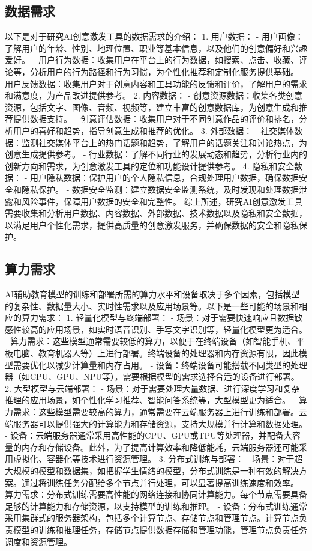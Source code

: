 \subsection{数据需求}
以下是对于研究AI创意激发工具的数据需求的介绍：
1. 用户数据：
- 用户画像：了解用户的年龄、性别、地理位置、职业等基本信息，以及他们的创意偏好和兴趣爱好。
- 用户行为数据：收集用户在平台上的行为数据，如搜索、点击、收藏、评论等，分析用户的行为路径和行为习惯，为个性化推荐和定制化服务提供基础。
- 用户反馈数据：收集用户对于创意内容和工具功能的反馈和评价，了解用户的需求和满意度，为产品改进提供参考。
2. 内容数据：
- 创意资源数据：收集各类创意资源，包括文字、图像、音频、视频等，建立丰富的创意数据库，为创意生成和推荐提供数据支持。
- 创意评估数据：收集用户对于不同创意作品的评价和排名，分析用户的喜好和趋势，指导创意生成和推荐的优化。
3. 外部数据：
- 社交媒体数据：监测社交媒体平台上的热门话题和趋势，了解用户的话题关注和讨论热点，为创意生成提供参考。
- 行业数据：了解不同行业的发展动态和趋势，分析行业内的创新方向和需求，为创意激发工具的定位和功能设计提供参考。
4. 隐私和安全数据：
- 用户隐私数据：保护用户的个人隐私信息，合规处理用户数据，确保数据安全和隐私保护。
- 数据安全监测：建立数据安全监测系统，及时发现和处理数据泄露和风险事件，保障用户数据的安全和完整性。
综上所述，研究AI创意激发工具需要收集和分析用户数据、内容数据、外部数据、技术数据以及隐私和安全数据，以满足用户个性化需求，提供高质量的创意激发服务，并确保数据的安全和隐私保护。

\subsection{算力需求}
AI辅助教育模型的训练和部署所需的算力水平和设备取决于多个因素，包括模型的复杂性、数据量大小、实时性需求以及应用场景等。以下是一些可能的场景和相应的算力需求：
1. 轻量化模型与终端部署：
  - 场景：对于需要快速响应且数据敏感性较高的应用场景，如实时语音识别、手写文字识别等，轻量化模型更为适合。
  - 算力需求：这些模型通常需要较低的算力，以便于在终端设备（如智能手机、平板电脑、教育机器人等）上进行部署。终端设备的处理器和内存资源有限，因此模型需要优化以减少计算量和内存占用。
  - 设备：终端设备可能搭载不同类型的处理器（如CPU、GPU、NPU等），需要根据模型的需求选择合适的设备进行部署。
2. 大型模型与云端部署：
  - 场景：对于需要处理大量数据、进行深度学习和复杂推理的应用场景，如个性化学习推荐、智能问答系统等，大型模型更为适合。
  - 算力需求：这些模型需要较高的算力，通常需要在云端服务器上进行训练和部署。云端服务器可以提供强大的计算能力和存储资源，支持大规模并行计算和数据处理。
  - 设备：云端服务器通常采用高性能的CPU、GPU或TPU等处理器，并配备大容量的内存和存储设备。此外，为了提高计算效率和降低能耗，云端服务器还可能采用虚拟化、容器化等技术进行资源管理。
3. 分布式训练与部署：
  - 场景：对于超大规模的模型和数据集，如把握学生情绪的模型，分布式训练是一种有效的解决方案。通过将训练任务分配给多个节点并行处理，可以显著提高训练速度和效率。
  - 算力需求：分布式训练需要高性能的网络连接和协同计算能力。每个节点需要具备足够的计算能力和存储资源，以支持模型的训练和推理。
  - 设备：分布式训练通常采用集群式的服务器架构，包括多个计算节点、存储节点和管理节点。计算节点负责模型的训练和推理任务，存储节点提供数据存储和管理功能，管理节点负责任务调度和资源管理。

